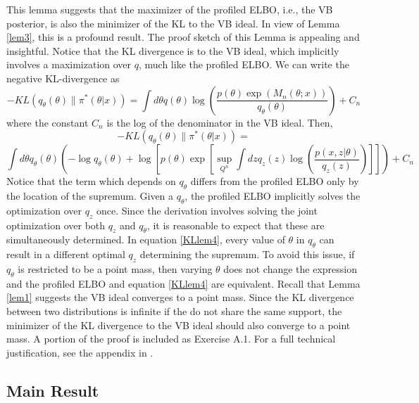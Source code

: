 This lemma suggests that the maximizer of the profiled ELBO, i.e., the VB posterior, is also the minimizer of the KL to the VB ideal. In view of Lemma \ref{lem3}, this is a profound result. The proof sketch of this Lemma is appealing and insightful. Notice that the KL divergence is to the VB ideal, which implicitly involves a maximization over $q$, much like the profiled ELBO. We can write the negative KL-divergence as
$$
 -KL(q_{\theta}(\theta)\| \pi^*(\theta|x)) = \int d\theta q(\theta)\log \left( \frac{p(\theta)\exp(M_n(\theta;x))}{q_{\theta}(\theta)} \right) + C_n
$$
%
where the constant $C_n$ is the log of the denominator in the VB ideal. Then,
\begin{equation}
\label{KLlem4}
-KL(q_{\theta}(\theta)\| \pi^*(\theta|x)) = 
\end{equation}
\begin{equation*}
\int d\theta q_{\theta}(\theta) \left(- \log q_\theta(\theta) + \log \left[ p(\theta) \exp \left[ \sup_{Q^n} \int dz q_{z}(z) \log\left( \frac{p(x,z|\theta)}{q_z(z)} \right)\right] \right] \right) + C_n
\end{equation*}
Notice that the term which depends on $q_{\theta}$ differs from the profiled ELBO only by the location of the supremum. Given a $q_{\theta}$, the profiled ELBO implicitly solves the optimization over $q_z$ once. Since the derivation involves solving the joint optimization over both $q_z$ and $q_{\theta}$, it is reasonable to expect that these are simultaneously determined. In equation \ref{KLlem4}, every value of $\theta$ in $q_{\theta}$ can result in a different optimal $q_z$ determining the supremum. To avoid this issue, if $q_{\theta}$ is restricted to be a point mass, then varying $\theta$ does not change the expression and the profiled ELBO and equation \ref{KLlem4} are equivalent. Recall that Lemma \ref{lem1} suggests the VB ideal converges to a point mass. Since the KL divergence between two distributions is infinite if the do not share the same support, the minimizer of the KL divergence to the VB ideal should also converge to a point mass. A portion of the proof is included as Exercise A.1. For a full technical justification, see the appendix in \cite{Wang:2019:VBVM}. 

\subsection{Main Result}
